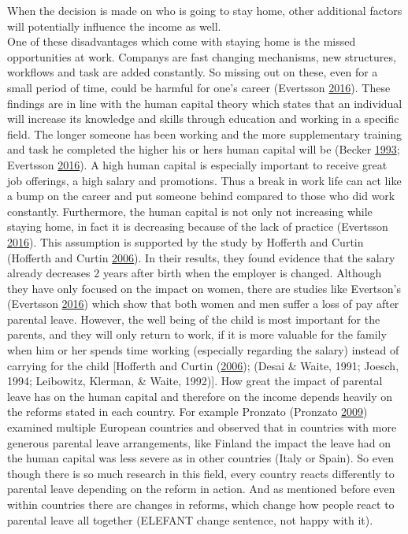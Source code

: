 \documentclass[
  12pt,
]{article}
\begin{document}
When the decision is made on who is going to stay home, other additional factors will potentially influence the income as well.\\
One of these disadvantages which come with staying home is the missed opportunities at work. Companys are fast changing mechanisms, new structures, workflows and task are added constantly. So missing out on these, even for a small period of time, could be harmful for one's career (Evertsson \protect\hyperlink{ref-evertsson_parental_2016}{2016}). These findings are in line with the human capital theory which states that an individual will increase its knowledge and skills through education and working in a specific field. The longer someone has been working and the more supplementary training and task he completed the higher his or hers human capital will be (Becker \protect\hyperlink{ref-becker_human_1993}{1993}; Evertsson \protect\hyperlink{ref-evertsson_parental_2016}{2016}). A high human capital is especially important to receive great job offerings, a high salary and promotions. Thus a break in work life can act like a bump on the career and put someone behind compared to those who did work constantly. Furthermore, the human capital is not only not increasing while staying home, in fact it is decreasing because of the lack of practice (Evertsson \protect\hyperlink{ref-evertsson_parental_2016}{2016}). This assumption is supported by the study by Hofferth and Curtin (Hofferth and Curtin \protect\hyperlink{ref-hofferth_parental_2006}{2006}). In their results, they found evidence that the salary already decreases 2 years after birth when the employer is changed. Although they have only focused on the impact on women, there are studies like Evertson's (Evertsson \protect\hyperlink{ref-evertsson_parental_2016}{2016}) which show that both women and men suffer a loss of pay after parental leave.
However, the well being of the child is most important for the parents, and they will only return to work, if it is more valuable for the family when him or her spends time working (especially regarding the salary) instead of carrying for the child {[}Hofferth and Curtin (\protect\hyperlink{ref-hofferth_parental_2006}{2006}); (Desai \& Waite, 1991; Joesch, 1994; Leibowitz, Klerman, \& Waite, 1992){]}.
How great the impact of parental leave has on the human capital and therefore on the income depends heavily on the reforms stated in each country. For example Pronzato (Pronzato \protect\hyperlink{ref-pronzato_return_2009}{2009}) examined multiple European countries and observed that in countries with more generous parental leave arrangements, like Finland the impact the leave had on the human capital was less severe as in other countries (Italy or Spain). So even though there is so much research in this field, every country reacts differently to parental leave depending on the reform in action. And as mentioned before even within countries there are changes in reforms, which change how people react to parental leave all together (ELEFANT change sentence, not happy with it).
\end{document}
